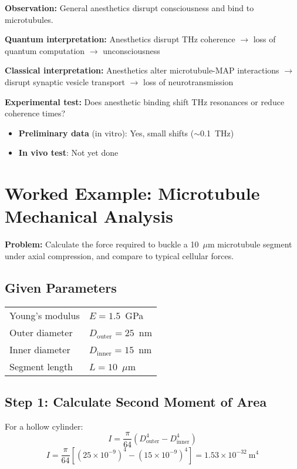 \textbf{Observation:} General anesthetics disrupt consciousness and bind to microtubules.

\textbf{Quantum interpretation:} Anesthetics disrupt THz coherence $\rightarrow$ loss of quantum computation $\rightarrow$ unconsciousness

\textbf{Classical interpretation:} Anesthetics alter microtubule-MAP interactions $\rightarrow$ disrupt synaptic vesicle transport $\rightarrow$ loss of neurotransmission

\textbf{Experimental test:} Does anesthetic binding shift THz resonances or reduce coherence times?
\begin{itemize}
\item \textbf{Preliminary data} (in vitro): Yes, small shifts ($\sim$0.1~THz)
\item \textbf{In vivo test}: Not yet done
\end{itemize}

\section{Worked Example: Microtubule Mechanical Analysis}

\textbf{Problem:} Calculate the force required to buckle a 10~$\mu$m microtubule segment under axial compression, and compare to typical cellular forces.

\subsection*{Given Parameters}

\begin{tabular}{@{}ll@{}}
Young's modulus & $E = 1.5$~GPa \\
Outer diameter & $D_{\mathrm{outer}} = 25$~nm \\
Inner diameter & $D_{\mathrm{inner}} = 15$~nm \\
Segment length & $L = 10$~$\mu$m \\
\end{tabular}

\subsection*{Step 1: Calculate Second Moment of Area}

For a hollow cylinder:
\begin{equation}
I = \frac{\pi}{64}(D_{\mathrm{outer}}^4 - D_{\mathrm{inner}}^4)
\end{equation}
\begin{equation}
I = \frac{\pi}{64}[(25 \times 10^{-9})^4 - (15 \times 10^{-9})^4] = 1.53 \times 10^{-32}\ \mathrm{m}^4
\end{equation}

